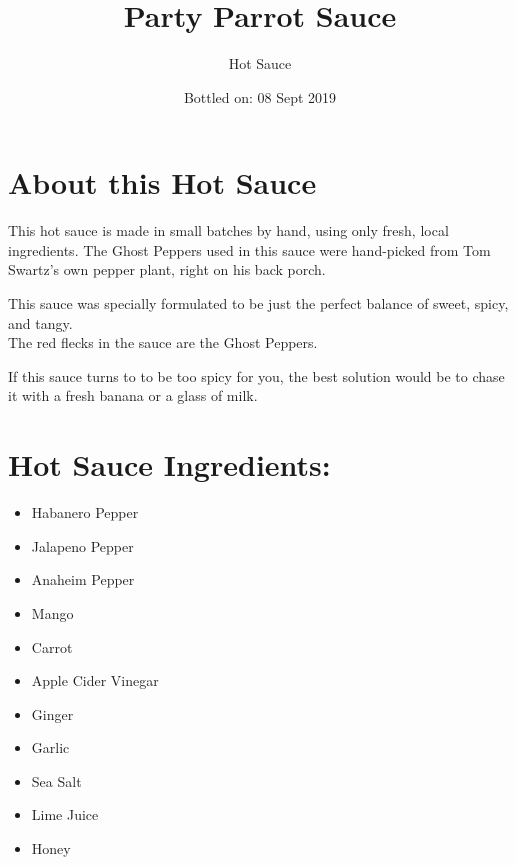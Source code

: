 \documentclass[10pt,foldmark,notumble]{leaflet}
\title{Party Parrot Sauce}
\author{Hot Sauce}
\date{Bottled on: 08 Sept 2019}
\begin{document}
\maketitle
\thispagestyle{empty}
\section{About this Hot Sauce \color{red}\hrulefill\color{black}}
This hot sauce is made in small batches by hand, using only fresh,
local ingredients. The Ghost Peppers used in this sauce were
hand-picked from Tom Swartz's own pepper plant, right on his back porch.

This sauce was specially formulated to be just the perfect balance of
sweet, spicy, and tangy.\\
The red flecks in the sauce are the Ghost Peppers.

If this sauce turns to to be too spicy for you,
the best solution would be to chase it with a fresh banana or a glass of milk.

\section{Hot Sauce Ingredients: \color{red}\hrulefill\color{black}}
\begin{itemize}
        \item Habanero Pepper
        \item Jalapeno Pepper
        \item Anaheim Pepper
        \item Mango
        \item Carrot
        \item Apple Cider Vinegar
        \item Ginger
        \item Garlic
        \item Sea Salt
        \item Lime Juice
        \item Honey
\end{itemize}
\end{document}
